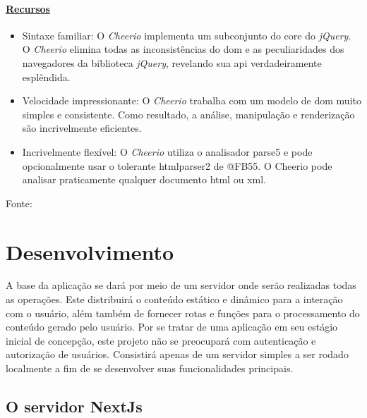 \subsubsection{\underline{Recursos}}

\begin{itemize}
        
	\item Sintaxe familiar: O \textit{Cheerio} implementa um subconjunto do core do \textit{jQuery}.
                O \textit{Cheerio} elimina todas as inconsistências do
                \acrshort{dom}
                e as peculiaridades dos navegadores da biblioteca \textit{jQuery}, revelando sua
                \acrshort{api}
                verdadeiramente esplêndida.
                
	\item Velocidade impressionante: O \textit{Cheerio} trabalha com um modelo de 
                \acrshort{dom}
                muito simples e consistente. Como resultado, a análise, manipulação e renderização são incrivelmente eficientes.
                
	\item Incrivelmente flexível: O \textit{Cheerio} utiliza o analisador parse5 e pode opcionalmente usar o tolerante htmlparser2 de @FB55. O Cheerio pode analisar praticamente qualquer documento
                \acrshort{html}
                ou
                \acrshort{xml}.
                
    
\end{itemize}

Fonte:
\cite{cheerio}

\chapter{Desenvolvimento}

A base da aplicação se dará por meio de um servidor onde serão realizadas
todas as operações. Este distribuirá o conteúdo estático e dinâmico
para a interação com o usuário, além também de fornecer rotas e funções
para o processamento do conteúdo gerado pelo usuário.
Por se tratar de uma aplicação em seu estágio inicial de concepção,
este projeto não se preocupará com autenticação e autorização de usuários.
Consistirá apenas de um servidor simples a ser rodado localmente a fim de
se desenvolver suas funcionalidades principais.

\section{O servidor NextJs}

